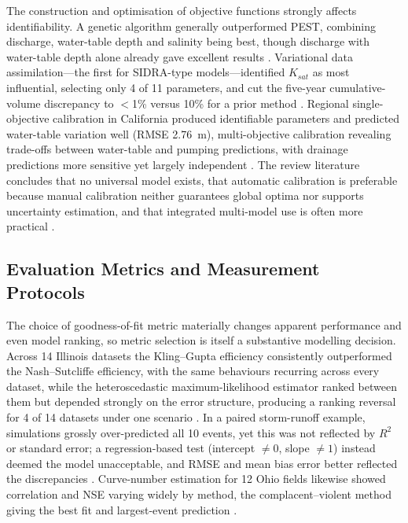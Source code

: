 \documentclass[11pt]{article}
\begin{document}
The construction and optimisation of objective functions strongly affects identifiability. A genetic algorithm generally outperformed PEST, combining discharge, water-table depth and salinity being best, though discharge with water-table depth alone already gave excellent results \parencite{Sedaghatdoost2019}. Variational data assimilation---the first for SIDRA-type models---identified $K_{sat}$ as most influential, selecting only 4 of 11 parameters, and cut the five-year cumulative-volume discrepancy to $<$1\% versus 10\% for a prior method \parencite{Chelil2022b}. Regional single-objective calibration in California produced identifiable parameters and predicted water-table variation well (RMSE 2.76~m), multi-objective calibration revealing trade-offs between water-table and pumping predictions, with drainage predictions more sensitive yet largely independent \parencite{Schoups2005}. The review literature concludes that no universal model exists, that automatic calibration is preferable because manual calibration neither guarantees global optima nor supports uncertainty estimation, and that integrated multi-model use is often more practical \parencite{Singh2019b}.

\subsection{Evaluation Metrics and Measurement Protocols}

The choice of goodness-of-fit metric materially changes apparent performance and even model ranking, so metric selection is itself a substantive modelling decision. Across 14 Illinois datasets the Kling--Gupta efficiency consistently outperformed the Nash--Sutcliffe efficiency, with the same behaviours recurring across every dataset, while the heteroscedastic maximum-likelihood estimator ranked between them but depended strongly on the error structure, producing a ranking reversal for 4 of 14 datasets under one scenario \parencite{Bruhn2025}. In a paired storm-runoff example, simulations grossly over-predicted all 10 events, yet this was not reflected by $R^2$ or standard error; a regression-based test (intercept $\ne0$, slope $\ne1$) instead deemed the model unacceptable, and RMSE and mean bias error better reflected the discrepancies \parencite{STONE1995,SAVABI1995}. Curve-number estimation for 12 Ohio fields likewise showed correlation and NSE varying widely by method, the complacent--violent method giving the best fit and largest-event prediction \parencite{Wessel2022}.
\end{document}
